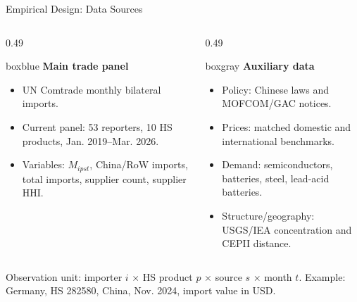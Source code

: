 \documentclass[aspectratio=169,11pt]{beamer}
\newcommand{\tightitem}{\setlength\itemsep{0.25em}}
\newcommand{\plainbox}[2]{%
  \begin{beamercolorbox}[rounded=true,sep=0.48em,wd=\textwidth]{#1}
    #2
  \end{beamercolorbox}
}
\begin{document}
\begin{frame}{Empirical Design: Data Sources}
  \small
  \begin{columns}[T,totalwidth=\textwidth]
    \begin{column}{0.49\textwidth}
      \plainbox{boxblue}{%
        \textbf{Main trade panel}
        \begin{itemize}
          \tightitem
          \item UN Comtrade monthly bilateral imports.
          \item Current panel: 53 reporters, 10 HS products, Jan. 2019--Mar. 2026.
          \item Variables: \(M_{ipst}\), China/RoW imports, total imports, supplier count, supplier HHI.
        \end{itemize}
      }
    \end{column}
    \begin{column}{0.49\textwidth}
      \plainbox{boxgray}{%
        \textbf{Auxiliary data}
        \begin{itemize}
          \tightitem
          \item Policy: Chinese laws and MOFCOM/GAC notices.
          \item Prices: matched domestic and international benchmarks.
          \item Demand: semiconductors, batteries, steel, lead-acid batteries.
          \item Structure/geography: USGS/IEA concentration and CEPII distance.
        \end{itemize}
      }
    \end{column}
  \end{columns}

  \vspace{0.12cm}
  {\footnotesize Observation unit: importer \(i\) \(\times\) HS product \(p\) \(\times\) source \(s\) \(\times\) month \(t\). Example: Germany, HS 282580, China, Nov. 2024, import value in USD.}
\end{frame}
\end{document}
